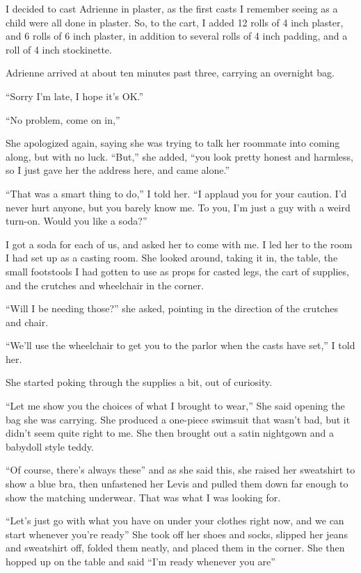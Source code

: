     I decided to cast Adrienne in plaster, as the first casts I remember seeing as a child were
all done in plaster. So, to the cart, I added 12 rolls of 4 inch plaster, and 6 rolls of 6 inch
plaster, in addition to several rolls of 4 inch padding, and a roll of 4 inch stockinette.

    Adrienne arrived at about ten minutes past three, carrying an overnight bag.

    ``Sorry I'm late, I hope it's OK.''

    ``No problem, come on in,''

    She apologized again, saying she was trying to talk her roommate into coming along, but with
no luck. ``But,'' she added, ``you look pretty honest and harmless, so I just gave her the
address here, and came alone.''

    ``That was a smart thing to do,'' I told her. ``I applaud you for your caution. I'd never
hurt anyone, but you barely know me. To you, I'm just a guy with a weird turn-on. Would you like
a soda?''

    I got a soda for each of us, and asked her to come with me. I led her to the room I had set
up as a casting room. She looked around, taking it in, the table, the small footstools I had
gotten to use as props for casted legs, the cart of supplies, and the crutches and wheelchair in
the corner.

    ``Will I be needing those?'' she asked, pointing in the direction of the crutches and chair.

    ``We'll use the wheelchair to get you to the parlor when the casts have set,'' I told her.

    She started poking through the supplies a bit, out of curiosity.

    ``Let me show you the choices of what I brought to wear,'' She said opening the bag she was
carrying. She produced a one-piece swimsuit that wasn't bad, but it didn't seem quite right to
me. She then brought out a satin nightgown and a babydoll style teddy.

    ``Of course, there's always these'' and as she said this, she raised her sweatshirt to show
a blue bra, then unfastened her Levis and pulled them down far enough to show the matching
underwear. That was what I was looking for.

    ``Let's just go with what you have on under your clothes right now, and we can start
whenever you're ready'' She took off her shoes and socks, slipped her jeans and sweatshirt off,
folded them neatly, and placed them in the corner. She then hopped up on the table and said
``I'm ready whenever you are''

